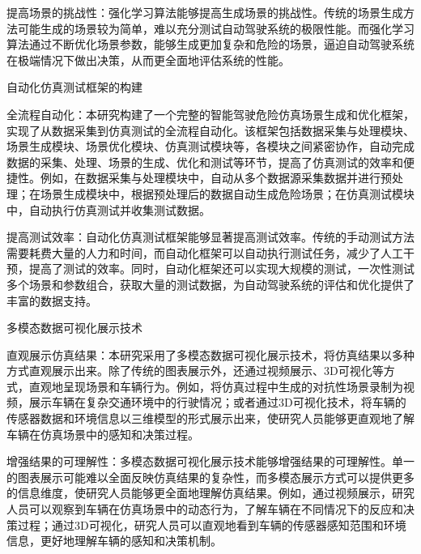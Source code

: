 提高场景的挑战性：强化学习算法能够提高生成场景的挑战性。传统的场景生成方法可能生成的场景较为简单，难以充分测试自动驾驶系统的极限性能。而强化学习算法通过不断优化场景参数，能够生成更加复杂和危险的场景，逼迫自动驾驶系统在极端情况下做出决策，从而更全面地评估系统的性能。

自动化仿真测试框架的构建

全流程自动化：本研究构建了一个完整的智能驾驶危险仿真场景生成和优化框架，实现了从数据采集到仿真测试的全流程自动化。该框架包括数据采集与处理模块、场景生成模块、场景优化模块、仿真测试模块等，各模块之间紧密协作，自动完成数据的采集、处理、场景的生成、优化和测试等环节，提高了仿真测试的效率和便捷性。例如，在数据采集与处理模块中，自动从多个数据源采集数据并进行预处理；在场景生成模块中，根据预处理后的数据自动生成危险场景；在仿真测试模块中，自动执行仿真测试并收集测试数据。

提高测试效率：自动化仿真测试框架能够显著提高测试效率。传统的手动测试方法需要耗费大量的人力和时间，而自动化框架可以自动执行测试任务，减少了人工干预，提高了测试的效率。同时，自动化框架还可以实现大规模的测试，一次性测试多个场景和参数组合，获取大量的测试数据，为自动驾驶系统的评估和优化提供了丰富的数据支持。

多模态数据可视化展示技术

直观展示仿真结果：本研究采用了多模态数据可视化展示技术，将仿真结果以多种方式直观展示出来。除了传统的图表展示外，还通过视频展示、3D可视化等方式，直观地呈现场景和车辆行为。例如，将仿真过程中生成的对抗性场景录制为视频，展示车辆在复杂交通环境中的行驶情况；或者通过3D可视化技术，将车辆的传感器数据和环境信息以三维模型的形式展示出来，使研究人员能够更直观地了解车辆在仿真场景中的感知和决策过程。

增强结果的可理解性：多模态数据可视化展示技术能够增强结果的可理解性。单一的图表展示可能难以全面反映仿真结果的复杂性，而多模态展示方式可以提供更多的信息维度，使研究人员能够更全面地理解仿真结果。例如，通过视频展示，研究人员可以观察到车辆在仿真场景中的动态行为，了解车辆在不同情况下的反应和决策过程；通过3D可视化，研究人员可以直观地看到车辆的传感器感知范围和环境信息，更好地理解车辆的感知和决策机制。

